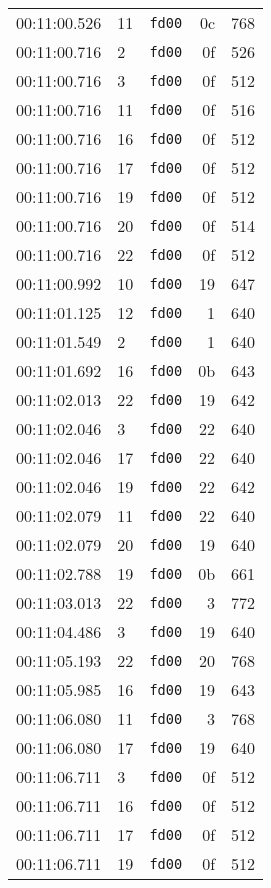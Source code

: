 \documentclass{article}
\begin{document}
\begin{longtable}{lllrr}
00:11:00.526 & 11 & \texttt{fd00} & 0c & 768 \\
00:11:00.716 & 2 & \texttt{fd00} & 0f & 526 \\
00:11:00.716 & 3 & \texttt{fd00} & 0f & 512 \\
00:11:00.716 & 11 & \texttt{fd00} & 0f & 516 \\
00:11:00.716 & 16 & \texttt{fd00} & 0f & 512 \\
00:11:00.716 & 17 & \texttt{fd00} & 0f & 512 \\
00:11:00.716 & 19 & \texttt{fd00} & 0f & 512 \\
00:11:00.716 & 20 & \texttt{fd00} & 0f & 514 \\
00:11:00.716 & 22 & \texttt{fd00} & 0f & 512 \\
00:11:00.992 & 10 & \texttt{fd00} & 19 & 647 \\
00:11:01.125 & 12 & \texttt{fd00} & 1 & 640 \\
00:11:01.549 & 2 & \texttt{fd00} & 1 & 640 \\
00:11:01.692 & 16 & \texttt{fd00} & 0b & 643 \\
00:11:02.013 & 22 & \texttt{fd00} & 19 & 642 \\
00:11:02.046 & 3 & \texttt{fd00} & 22 & 640 \\
00:11:02.046 & 17 & \texttt{fd00} & 22 & 640 \\
00:11:02.046 & 19 & \texttt{fd00} & 22 & 642 \\
00:11:02.079 & 11 & \texttt{fd00} & 22 & 640 \\
00:11:02.079 & 20 & \texttt{fd00} & 19 & 640 \\
00:11:02.788 & 19 & \texttt{fd00} & 0b & 661 \\
00:11:03.013 & 22 & \texttt{fd00} & 3 & 772 \\
00:11:04.486 & 3 & \texttt{fd00} & 19 & 640 \\
00:11:05.193 & 22 & \texttt{fd00} & 20 & 768 \\
00:11:05.985 & 16 & \texttt{fd00} & 19 & 643 \\
00:11:06.080 & 11 & \texttt{fd00} & 3 & 768 \\
00:11:06.080 & 17 & \texttt{fd00} & 19 & 640 \\
00:11:06.711 & 3 & \texttt{fd00} & 0f & 512 \\
00:11:06.711 & 16 & \texttt{fd00} & 0f & 512 \\
00:11:06.711 & 17 & \texttt{fd00} & 0f & 512 \\
00:11:06.711 & 19 & \texttt{fd00} & 0f & 512 \\

\end{longtable}
\end{document}
